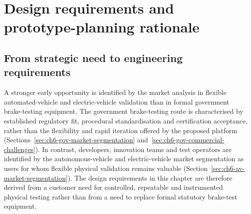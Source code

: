 
\label{chap:eem_prototype_planning}

\section{Design requirements and prototype-planning rationale}
\label{sec:ch8_design_requirements_rationale}

\subsection{From strategic need to engineering requirements}
\label{sec:ch8_strategic_need_to_requirements}

A stronger early opportunity is identified by the market analysis in flexible automated-vehicle and electric-vehicle validation than in formal government brake-testing equipment. The government brake-testing route is characterised by established regulatory fit, procedural standardisation and certification acceptance, rather than the flexibility and rapid iteration offered by the proposed platform (Sections~\ref{sec:ch6-gov-market-segmentation} and~\ref{sec:ch6-gov-commercial-challenges}). In contrast, developers, innovation teams and test operators are identified by the autonomous-vehicle and electric-vehicle market segmentation as users for whom flexible physical validation remains valuable (Section~\ref{sec:ch6-av-market-segmentation}). The design requirements in this chapter are therefore derived from a customer need for controlled, repeatable and instrumented physical testing rather than from a need to replace formal statutory brake-test equipment.

